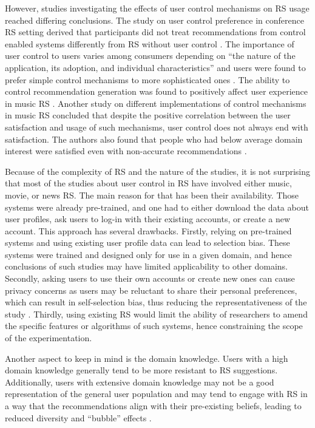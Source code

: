 \documentclass[a4paper,12pt]{article}
\begin{document}
However, studies investigating the effects of user control mechanisms on RS usage reached differing conclusions. The study on user control preference in conference RS setting derived that participants did not treat recommendations from control enabled systems differently from RS without user control \citep{jameson2002pros}. The importance of user control to users varies among consumers depending on ``the nature of the application, its adoption, and individual characteristics'' and users were found to prefer simple control mechanisms to more sophisticated ones \citep{knijnenburg2011each, knijnenburgExplainingUserExperience2012}. The ability to control recommendation generation was found to positively affect user experience in music RS \citep{bostandjiev2012tasteweights, knijnenburgExplainingUserExperience2012}. Another study on different implementations of control mechanisms in music RS concluded that despite the positive correlation between the user satisfaction and usage of such mechanisms, user control does not always end with satisfaction. The authors also found that people who had below average domain interest were satisfied even with non-accurate recommendations \citep{hijikataStudyUserIntervention2014}.

Because of the complexity of RS and the nature of the studies, it is not surprising that most of the studies about user control in RS have involved either music, movie, or news RS. The main reason for that has been their availability. Those systems were already pre-trained, and one had to either download the data about user profiles, ask users to log-in with their existing accounts, or create a new account. This approach has several drawbacks. Firstly, relying on pre-trained systems and using existing user profile data can lead to selection bias. These systems were trained and designed only for use in a given domain, and hence conclusions of such studies may have limited applicability to other domains. Secondly, asking users to use their own accounts or create new ones can cause privacy concerns as users may be reluctant to share their personal preferences, which can result in self-selection bias, thus reducing the representativeness of the study \citep{belanger2011privacy}. Thirdly, using existing RS would limit the ability of researchers to amend the specific features or algorithms of such systems, hence constraining the scope of the experimentation.

Another aspect to keep in mind is the domain knowledge. Users with a high domain knowledge generally tend to be more resistant to RS suggestions. Additionally, users with extensive domain knowledge may not be a good representation of the general user population and may tend to engage with RS in a way that the recommendations align with their pre-existing beliefs, leading to reduced diversity and ``bubble'' effects \citep{mollerNotBlameIt2018}.  
\end{document}
